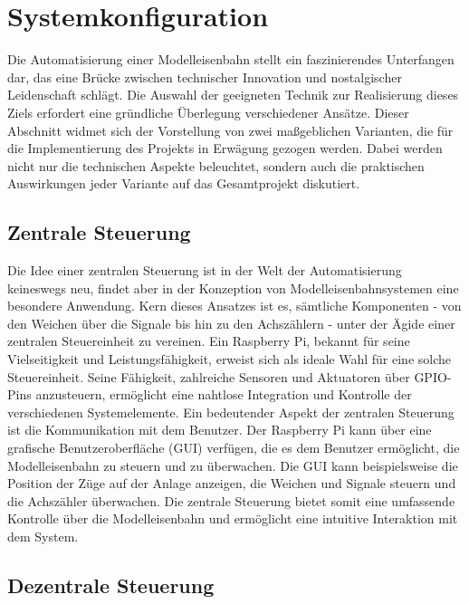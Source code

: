 \section{Systemkonfiguration}\label{text:Methodik:Systemkonfiguration}

Die Automatisierung einer Modelleisenbahn stellt ein faszinierendes Unterfangen dar, das eine Brücke zwischen technischer Innovation und nostalgischer Leidenschaft schlägt. Die Auswahl der geeigneten Technik zur Realisierung dieses Ziels erfordert eine gründliche Überlegung verschiedener Ansätze. Dieser Abschnitt widmet sich der Vorstellung von zwei maßgeblichen Varianten, die für die Implementierung des Projekts in Erwägung gezogen werden. Dabei werden nicht nur die technischen Aspekte beleuchtet, sondern auch die praktischen Auswirkungen jeder Variante auf das Gesamtprojekt diskutiert.

\subsection{Zentrale Steuerung}\label{text:Methodik:Systemkonfiguration:Zentrale-Steuerung}

Die Idee einer zentralen Steuerung ist in der Welt der Automatisierung keineswegs neu, findet aber in der Konzeption von Modelleisenbahnsystemen eine besondere Anwendung. Kern dieses Ansatzes ist es, sämtliche Komponenten - von den Weichen über die Signale bis hin zu den Achszählern - unter der Ägide einer zentralen Steuereinheit zu vereinen. Ein Raspberry Pi, bekannt für seine Vielseitigkeit und Leistungsfähigkeit, erweist sich als ideale Wahl für eine solche Steuereinheit. Seine Fähigkeit, zahlreiche Sensoren und Aktuatoren über GPIO-Pins anzusteuern, ermöglicht eine nahtlose Integration und Kontrolle der verschiedenen Systemelemente.
\newline
Ein bedeutender Aspekt der zentralen Steuerung ist die Kommunikation mit dem Benutzer. Der Raspberry Pi kann über eine grafische Benutzeroberfläche (GUI) verfügen, die es dem Benutzer ermöglicht, die Modelleisenbahn zu steuern und zu überwachen. Die GUI kann beispielsweise die Position der Züge auf der Anlage anzeigen, die Weichen und Signale steuern und die Achszähler überwachen. Die zentrale Steuerung bietet somit eine umfassende Kontrolle über die Modelleisenbahn und ermöglicht eine intuitive Interaktion mit dem System.

\subsection{Dezentrale Steuerung}\label{text:Methodik:Systemkonfiguration:Dezentrale-Steuerung}

